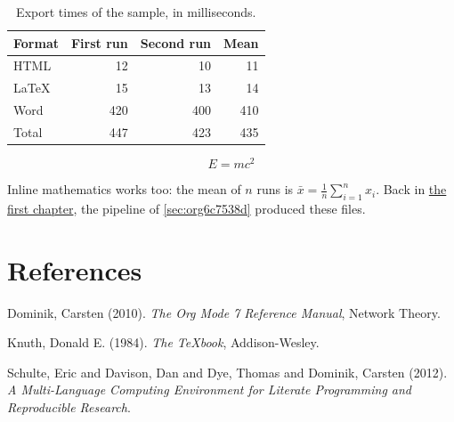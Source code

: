 \documentclass[11pt]{book}
\begin{document}
\begin{table}[htbp]
\caption{\label{tab:orgf625274}Export times of the sample, in milliseconds.}
\centering
\begin{tabular}{lrrr}
Format & First run & Second run & Mean\\
\hline
HTML & 12 & 10 & 11\\
\LaTeX{} & 15 & 13 & 14\\
Word & 420 & 400 & 410\\
\hline
Total & 447 & 423 & 435\\
\end{tabular}
\end{table}

\begin{equation}
\label{eq:orgc7843a4}
E = m c^2
\end{equation}

Inline mathematics works too: the mean of \(n\) runs is
\(\bar{x} = \frac{1}{n}\sum_{i=1}^{n} x_i\). Back in
\hyperref[sec:orgb5ff499]{the first chapter}, the pipeline of
\ref{sec:org6c7538d} produced these files.
\part*{References}
\label{sec:org44d2ff9}
\noindent
Dominik, Carsten (2010). \emph{The Org Mode 7 Reference Manual}, Network Theory.

\noindent
Knuth, Donald E. (1984). \emph{The {\TeX}book}, Addison-Wesley.

\noindent
Schulte, Eric and Davison, Dan and Dye, Thomas and Dominik, Carsten (2012). \emph{A Multi-Language Computing Environment for Literate Programming and Reproducible Research}.
\end{document}
